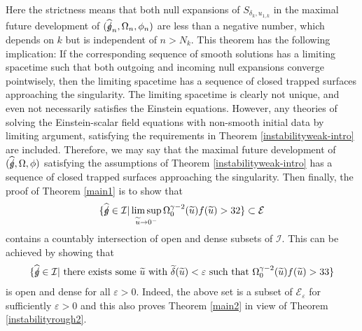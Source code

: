 \documentclass[11pt,reqno]{amsart}
\theoremstyle{definition}
\newtheorem{remark}{Remark}[section]
\numberwithin{equation}{section}
\def\Cb{\underline{C}}
\newcommand{\tdelta}{\widetilde{\delta}}
\newcommand{\tu}{\widetilde{u}}
\def\gs{\mbox{$g \mkern -9mu /$}}
\begin{document}
Here the strictness means that both null expansions of $S_{\delta_k,u_{1,k}}$ in the maximal future development of $(\widehat{\gs}_n,\Omega_n,\phi_n)$ are less than a negative number, which depends on $k$ but is independent of $n>N_k$. This theorem has the following implication: If the corresponding sequence of smooth solutions has a limiting spacetime such that both outgoing and incoming null expansions converge pointwisely, then the limiting spacetime has a sequence of closed trapped surfaces approaching the singularity. The limiting spacetime is clearly not unique, and even not necessarily satisfies the Einstein equations. However, any theories of solving the Einstein-scalar field equations with non-smooth initial data by limiting argument, satisfying the requirements in Theorem \ref{instabilityweak-intro} are included. Therefore, we may say that the maximal future development of $(\widehat{\gs},\Omega,\phi)$ satisfying the assumptions of Theorem \ref{instabilityweak-intro} has a sequence of closed trapped surfaces approaching the singularity. Then finally, the proof of Theorem \ref{main1} is to show that
\begin{align*}
\{\widehat{\gs}\in\mathcal{I}|\limsup_{\tu\to0^-}\Omega_0^{\gamma-2}(\tu)f(\tu)>32\}\subset\mathcal{E}
\end{align*}
contains a countably intersection of open and dense subsets of $\mathcal{I}$. This can be achieved by showing that
\begin{align*}
\{\widehat{\gs}\in\mathcal{I}|\text{ there exists some $\tu$ with $\tdelta(\tu)<\varepsilon$ such that }\Omega_0^{\gamma-2}(\tu)f(\tu)>33\}
\end{align*}
is open and dense for all $\varepsilon>0$. Indeed, the above set is a subset of $\mathcal{E}_\varepsilon$ for sufficiently $\varepsilon>0$ and this also proves Theorem \ref{main2} in view of Theorem \ref{instabilityrough2}.


\end{document}
